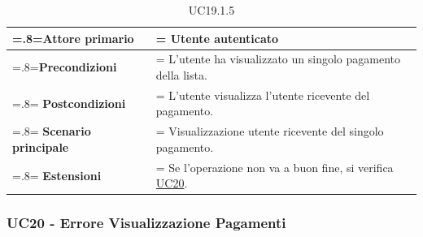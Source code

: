             \begin{table}[H]
                \centering
                \renewcommand{\arraystretch}{1.8}
                \renewcommand\tabularxcolumn[1]{m{#1}}
                \begin{tabularx}{0.9\textwidth} {
                    >{\hsize=.8\hsize\linewidth=\hsize}X
                    >{\hsize=1.2\hsize\linewidth=\hsize}X}
                    \hline
                    \textbf{Attore primario} & Utente autenticato \\
                    \hline
                    \textbf{Precondizioni} & L'utente ha visualizzato un singolo pagamento della lista. \\
                    \hline
                    \textbf{Postcondizioni} & L'utente visualizza l'utente ricevente del pagamento. \\
                    \hline
                    \textbf{Scenario principale} & Visualizzazione utente ricevente del singolo pagamento. \\
                    \hline
                    \textbf{Estensioni} & Se l'operazione non va a buon fine, si verifica \hyperref[UC20]{UC20}. \\
                    \hline
                \end{tabularx}
                \caption{UC19.1.5}
            \end{table}

        \subsubsection{UC20 - Errore Visualizzazione Pagamenti}
        \label{UC20}

